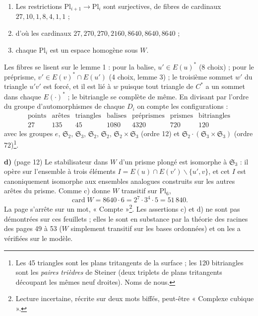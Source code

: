 \documentclass[11pt,a4paper]{article}
\begin{document}
\begin{enumerate}
\item[a)] Les restrictions $\mathrm{Pl}_{i+1} \to \mathrm{Pl}_i$ sont
  surjectives, de fibres de cardinaux $27, 10, 1, 8, 4, 1, 1$ ;
\item[b)] d'où les cardinaux $27, 270, 270, 2160, 8640, 8640, 8640$ ;
\item[c)] chaque $\mathrm{Pl}_i$ est un espace homogène sous $W$.
\end{enumerate}

Les fibres se lisent sur le lemme 1 : pour la balise, $u' \in E(u)^*$ (8
choix) ; pour le préprisme, $v' \in E(v)^* \cap E(u')$ (4 choix, lemme 3) ; le
troisième sommet $w'$ du triangle $u'v'$ est forcé, et il est lié à $w$
puisque tout triangle de $C^*$ a un sommet dans chaque $E(\cdot)^*$ ; le
bitriangle se complète de même. En divisant par l'ordre du groupe
d'automorphismes de chaque $D_i$ on compte les configurations :
\[
\begin{array}{lllllll}
\text{points} & \text{arêtes} & \text{triangles} & \text{balises} &
\text{préprismes} & \text{prismes} & \text{bitriangles} \\
27 & 135 & 45 & 1080 & 4320 & 720 & 120
\end{array}
\]
avec les groupes $e$, $\mathfrak{S}_2$, $\mathfrak{S}_3$, $\mathfrak{S}_2$,
$\mathfrak{S}_2$, $\mathfrak{S}_2 \times \mathfrak{S}_3$ (ordre 12) et
$\mathfrak{S}_2 \cdot (\mathfrak{S}_3 \times \mathfrak{S}_3)$ (ordre
72)\footnote{Les 45 triangles sont les plans tritangents de la surface ; les
120 bitriangles sont les \emph{paires trièdres} de Steiner (deux triplets de
plans tritangents découpant les mêmes neuf droites). Noms de nous.}.

\textbf{d)} (page 12) Le stabilisateur dans $W$ d'un prisme plongé est
isomorphe à $\mathfrak{S}_3$ : il opère sur l'ensemble à trois éléments
$I = E(u) \cap E(v') \smallsetminus \lbrace u', v\rbrace$, et cet $I$ est
canoniquement isomorphe aux ensembles analogues construits sur les autres
arêtes du prisme. Comme c) donne $W$ transitif sur $\mathrm{Pl}_6$,
\[
\operatorname{card} W = 8640 \cdot 6 = 2^7 \cdot 3^4 \cdot 5 = 51\,840 .
\]
La page s'arrête sur un mot, « Compte »\footnote{Lecture incertaine, récrite
sur deux mots biffés, peut-être « Complexe cubique ».}. Les assertions c) et d)
ne sont pas démontrées sur ces feuillets ; elles le sont en substance par la
théorie des racines des pages 49 à 53 ($W$ simplement transitif sur les bases
ordonnées) et on les a vérifiées sur le modèle.
\end{document}
